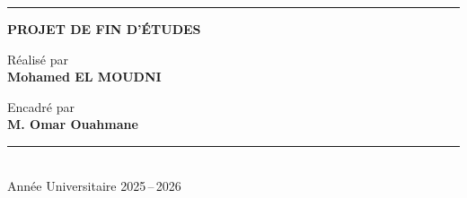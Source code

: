 \begin{titlepage}
\vspace{0.8cm}

{\color{accentcolor}\rule{8cm}{1.5pt}}

\vspace{1.5cm}

{\large\sffamily\bfseries\color{maincolor} PROJET DE FIN D'ÉTUDES}

\vspace{2.5cm}

\begin{minipage}[t]{0.42\textwidth}
  \centering
  {\sffamily\color{graytext}\small Réalisé par}\\[8pt]
  {\sffamily\bfseries\large Mohamed EL MOUDNI}
\end{minipage}
\hfill
\begin{minipage}[t]{0.42\textwidth}
  \centering
  {\sffamily\color{graytext}\small Encadré par}\\[8pt]
  {\sffamily\bfseries\large M. Omar Ouahmane}
\end{minipage}

\vfill

{\color{grayrule}\rule{5cm}{0.4pt}}\\[10pt]
{\sffamily\large\color{graytext} Année Universitaire 2025\,--\,2026}

\end{titlepage}
